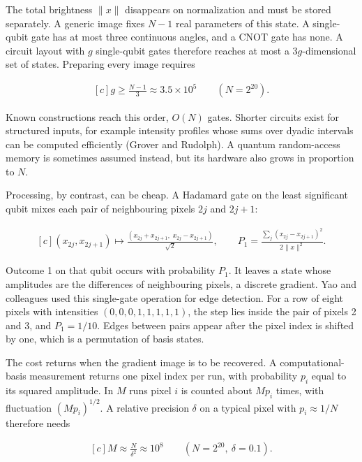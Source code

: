 \documentclass[11pt,oneside]{book}
\newenvironment{centeredalign}{\[\begin{gathered}[c]}{\end{gathered}\]}
\begin{document}
The total brightness \(\|x\|\) disappears on normalization and must be stored separately. A generic image fixes \(N-1\) real parameters of this state. A single-qubit gate has at most three continuous angles, and a CNOT gate has none. A circuit layout with \(g\) single-qubit gates therefore reaches at most a \(3g\)-dimensional set of states. Preparing every image requires

\begin{centeredalign}
g\geq\frac{N-1}{3}\approx3.5\times10^5\qquad(N=2^{20}).
\end{centeredalign}

Known constructions reach this order, \(O(N)\) gates. Shorter circuits exist for structured inputs, for example intensity profiles whose sums over dyadic intervals can be computed efficiently (Grover and Rudolph). A quantum random-access memory is sometimes assumed instead, but its hardware also grows in proportion to \(N\).

Processing, by contrast, can be cheap. A Hadamard gate on the least significant qubit mixes each pair of neighbouring pixels \(2j\) and \(2j+1\):

\begin{centeredalign}
(x_{2j},x_{2j+1})\mapsto\frac{(x_{2j}+x_{2j+1},\;x_{2j}-x_{2j+1})}{\sqrt2},\qquad
P_1=\frac{\sum_j(x_{2j}-x_{2j+1})^2}{2\|x\|^2}.
\end{centeredalign}

Outcome 1 on that qubit occurs with probability \(P_1\). It leaves a state whose amplitudes are the differences of neighbouring pixels, a discrete gradient. Yao and colleagues used this single-gate operation for edge detection. For a row of eight pixels with intensities \((0,0,0,1,1,1,1,1)\), the step lies inside the pair of pixels 2 and 3, and \(P_1=1/10\). Edges between pairs appear after the pixel index is shifted by one, which is a permutation of basis states.

The cost returns when the gradient image is to be recovered. A computational-basis measurement returns one pixel index per run, with probability \(p_i\) equal to its squared amplitude. In \(M\) runs pixel \(i\) is counted about \(Mp_i\) times, with fluctuation \((Mp_i)^{1/2}\). A relative precision \(\delta\) on a typical pixel with \(p_i\approx1/N\) therefore needs

\begin{centeredalign}
M\approx\frac{N}{\delta^2}\approx10^8\qquad(N=2^{20},\ \delta=0.1).
\end{centeredalign}
\end{document}
